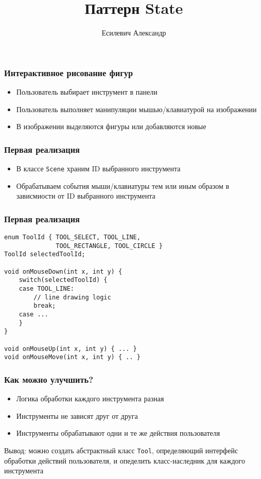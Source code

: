 \documentclass[handout]{beamer}
\title{Паттерн State}
\author{Есилевич Александр}
\begin{document}
\maketitle

\begin{frame}[fragile]
\frametitle{Интерактивное рисование фигур}
\begin{itemize}
\item Пользователь выбирает инструмент в панели
\item Пользователь выполняет манипуляции мышью/клавиатурой на изображении
\item В изображении выделяются фигуры или добавляются новые
\end{itemize}
\end{frame}


\begin{frame}[fragile]
\frametitle{Первая реализация}
\begin{itemize}
\item В классе \lstinline{Scene} храним ID выбранного инструмента
\item Обрабатываем события мыши/клавиатуры тем или иным образом в
      зависмиости от ID выбранного инструмента
\end{itemize}
\end{frame}


\begin{frame}[fragile]
\frametitle{Первая реализация}
\begin{lstlisting}
enum ToolId { TOOL_SELECT, TOOL_LINE,
              TOOL_RECTANGLE, TOOL_CIRCLE }
ToolId selectedToolId;

void onMouseDown(int x, int y) {
    switch(selectedToolId) {
    case TOOL_LINE:
        // line drawing logic
        break;
    case ...
    }
}

void onMouseUp(int x, int y) { ... }
void onMouseMove(int x, int y) { .. }
\end{lstlisting}
\end{frame}


\begin{frame}[fragile]
\frametitle{Как можно улучшить?}
\begin{itemize}
\item Логика обработки каждого инструмента разная
\item Инструменты не зависят друг от друга
\item Инструменты обрабатывают одни и те же действия пользователя
\end{itemize}
\vspace{1cm}
Вывод: можно создать абстрактный класс \lstinline{Tool},
определяющий интерфейс обработки действий пользователя,
и опеделить класс-наследник для каждого инструмента
\end{frame}
\end{document}
